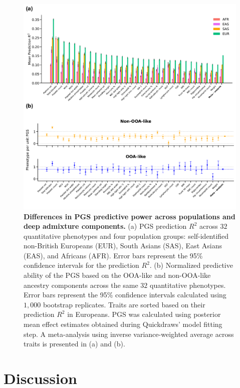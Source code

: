 \begin{figure}[h!]
    \centering
    \includegraphics[width=\linewidth]{figures/gb_deepadmix/gb_real_deep_5.pdf}
    \captionsetup{width=\textwidth+3cm}
    \caption{
    \footnotesize
    \textbf{Differences in PGS predictive power across populations and deep admixture components.} (a) PGS prediction $R^2$ across $32$ quantitative phenotypes and four population groups: self-identified non-British Europeans (EUR), South Asians (SAS), East Asians (EAS), and Africans (AFR). Error bars represent the 95\% confidence intervals for the prediction $R^2$. (b) Normalized predictive ability of the PGS based on the OOA-like and non-OOA-like ancestry components across the same $32$ quantitative phenotypes. Error bars represent the 95\% confidence intervals calculated using $1{,}000$ bootstrap replicates. Traits are sorted based on their prediction $R^2$ in Europeans. PGS was calculated using posterior mean effect estimates obtained during Quickdraws' model fitting step. A meta-analysis using inverse variance-weighted average across traits is presented in (a) and (b).
    }
    \label{fig:gb_deepadmix_anchor}
\end{figure}

\clearpage

\section{Discussion}
\label{sec:ch3-discussion}

